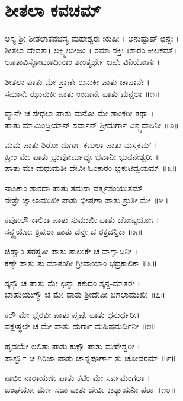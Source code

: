 \section{ಶೀತಲಾ ಕವಚಮ್}
ಅಸ್ಯ ಶ್ರೀ ಶೀತಲಾಕವಚಸ್ಯ ಮಹೇಶ್ವರಃ ಋಷಿಃ । ಅನುಷ್ಟುಪ್ ಛನ್ದಃ ।\\
ಶೀತಲಾ ದೇವತಾ। ಲಕ್ಷ್ಮೀಬೀಜಂ । ರಮಾ ಶಕ್ತಿಃ ।ತಾರಂ ಕೀಲಕಮ್।\\
ಲೂತಾವಿಸ್ಫೋಟಕಾದೀನಾಂ ಶಾಂತ್ಯರ್ಥೇ ಜಪೇ ವಿನಿಯೋಗಃ ।\\


ಶೀತಲಾ ಪಾತು ಮೇ ಪ್ರಾಣೇ ರುನುಕೀ ಪಾತು ಚಾಪಾನೇ ।\\
ಸಮಾನೇ ಝುನುಕೀ ಪಾತು ಉದಾನೇ ಪಾತು ಮನ್ದಲಾ ॥೧॥

ವ್ಯಾನೇ ಚ ಸೇಢಲಾ ಪಾತು ಮನೋ ಮೇ ಶಾಂಕರೀ ತಥಾ ।\\
ಪಾತು ಮಾಮಿಂದ್ರಿಯಾನ್ ಸರ್ವಾನ್ ಶ್ರೀದುರ್ಗಾ ವಿನ್ಧ್ಯವಾಸಿನೀ ॥೨॥

ಮಮ ಪಾತು ಶಿರೋ ದುರ್ಗಾ ಕಮಲಾ ಪಾತು ಮಸ್ತಕಮ್ ।\\
ಹ್ರೀಂ ಮೇ ಪಾತು ಭ್ರುವೋರ್ಮಧ್ಯೇ ಭವಾನೀ ಭುವನೇಶ್ವರೀ ॥\\
ಪಾತು ಮೇ ಮಧುಮತೀ ದೇವೀ ಓಂಕಾರಂ ಭೃಕುಟಿದ್ವಯಮ್ ॥೩॥

ನಾಸಿಕಾಂ ಶಾರದಾ ಪಾತು ತಮಸಾ ವರ್ತ್ಮಸಂಯುತಮ್ ।\\
ನೇತ್ರೇ ಜ್ವಾಲಾಮುಖೀ ಪಾತು ಭೀಷಣಾ ಪಾತು ಶ್ರುತೀ ಮೇ ॥೪॥

ಕಪೋಲೌ ಕಾಲಿಕಾ ಪಾತು ಸುಮುಖೀ ಪಾತು ಚೋಷ್ಠಯೋಃ ।\\
ಸನ್ಧ್ಯಯೋಃ ತ್ರಿಪುರಾ ಪಾತು ದನ್ತೇ ಚ ರಕ್ತದನ್ತಿಕಾ ॥೫॥

ಜಿಹ್ವಾಂ ಸರಸ್ವತೀ ಪಾತು ತಾಲುಕೇ ಚ ವಾಗ್ವಾದಿನೀ ।\\
ಕಣ್ಠೇ ಪಾತು ತು ಮಾತಂಗೀ ಗ್ರೀವಾಯಾಂ ಭದ್ರಕಾಲಿಕಾ ॥೬॥

ಸ್ಕನ್ಧೌ ಚ ಪಾತು ಮೇ ಛಿನ್ನಾ ಕಕುದಂ ಸ್ಕನ್ದ-ಮಾತರಃ ।\\
ಬಾಹುಯುಗ್ಮೌ ಚ ಮೇ ಪಾತು ಶ್ರೀದೇವೀ ಬಗಲಾಮುಖೀ ॥೭॥

ಕರೌ ಮೇ ಭೈರವೀ ಪಾತು ಪೃಷ್ಠೇ ಪಾತು ಧನುರ್ಧರೀ।\\
ವಕ್ಷಃಸ್ಥಲೇ ಚ ಮೇ ಪಾತು ದುರ್ಗಾ ಮಹಿಷಮರ್ದಿನೀ ॥೮॥

ಹೃದಯೇ ಲಲಿತಾ ಪಾತು ಕುಕ್ಷೌ ಪಾತು ಮಹೇಶ್ವರೀ ।\\
ಪಾರ್ಶ್ವೌ ಚ ಗಿರಿಜಾ ಪಾತು ಚಾನ್ನಪೂರ್ಣಾ ತು ಚೋದರಮ್ ॥೯॥

ನಾಭಿಂ ನಾರಾಯಣೀ ಪಾತು ಕಟಿಂ ಮೇ ಸರ್ವಮಂಗಲಾ ।\\
ಜಂಘಯೋ ರ್ಮೇ ಸದಾ ಪಾತು ದೇವೀ ಕಾತ್ಯಾಯನೀ ಪರಾ ॥೧೦॥


